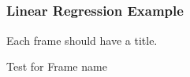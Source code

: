 
\newcommand\here{lalala}


\subsection{}
\begin{frame}
  \frametitle{Linear Regression Example}
  Each frame should have a title.

\end{frame}



\begin{frame}{Test for Frame name}

\end{frame}
